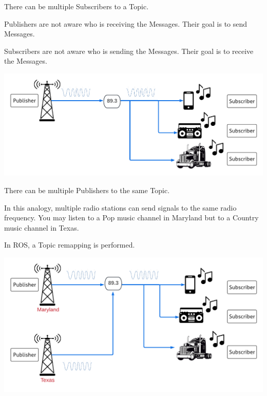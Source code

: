 \documentclass[usenames,11,dvipsnames,svgnames,x11names,aspectratio=1610,bibref]{beamer}
\newcommand{\iconColor}[1]{\textcolor{iconColor}{#1}}
\newcommand{\mydisclaimer}{{\color{disclaimer}{\footnotesize Lecture 1~}}}
\renewcommand\sec{{\cnordSix{\secname}\hfill\mydisclaimer} }
\newcommand{\mynote}{\iconColor{\faEdit}\xspace}
\begin{document}
\begin{frame}[fragile]{\sec}
\vspace*{\fill}
\begin{center} 
There can be multiple Subscribers to a Topic. 

\begin{compactitem}
\footnotesize
\item Publishers are not aware who is receiving the Messages. Their goal is to send Messages.
\item Subscribers are not aware who is sending the Messages. Their goal is to receive the Messages.
\end{compactitem}

\includegraphics[width=.7\linewidth]{figures/lecture2/analogy6.pdf}

\end{center}
\vspace*{\fill}
\end{frame}

 
\begin{frame}[fragile]{\sec}
\vspace*{\fill}
\begin{center} 
There can be multiple Publishers to the same Topic. 

\begin{compactitem}
\footnotesize

\item In this analogy, multiple radio stations can send signals to the same radio frequency. You may listen to a Pop music channel in Maryland but to a Country music channel in Texas.
\item \mynote In ROS, a Topic remapping is performed.
\end{compactitem}

\includegraphics[width=.7\linewidth]{figures/lecture2/analogy7.pdf}

\end{center}
\vspace*{\fill}
\end{frame}
\end{document}
